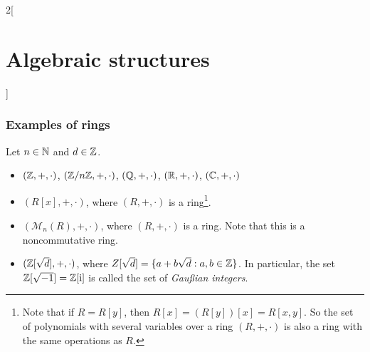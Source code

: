 \documentclass[../../../main.tex]{subfiles}
\begin{document}
\begin{multicols}{2}[\section{Algebraic structures}]
\subsubsection*{Examples of rings}\label{AS-examples2}
Let $n\in\mathbb{N}$ and $d\in\mathbb{Z}$.
\begin{itemize}
    \item $(\mathbb{Z},+,\cdot)$, $(\mathbb{Z}/n\mathbb{Z},+,\cdot)$, $(\mathbb{Q},+,\cdot)$, $(\mathbb{R},+,\cdot)$, $(\mathbb{C},+,\cdot)$
    \item $(R[x],+,\cdot)$, where $(R,+,\cdot)$ is a ring\footnote{Note that if $R=R[y]$, then $R[x]=(R[y])[x]=R[x,y]$. So the set of polynomials with several variables over a ring $(R,+,\cdot)$ is also a ring with the same operations as $R$.}.
    \item $(\mathcal{M}_n(R),+,\cdot)$, where $(R,+,\cdot)$ is a ring. Note that this is a noncommutative ring.
    \item $(\mathbb{Z}[\sqrt{d}],+,\cdot)$, where $Z[\sqrt{d}]=\{a+b\sqrt{d}:a,b\in\mathbb{Z}\}$. In particular, the set $\mathbb{Z}[\sqrt{-1}]=\mathbb{Z}[\text{i}]$ is called the set of \textit{Gau\ss ian integers}.
\end{itemize}
\end{multicols}
\end{document}

